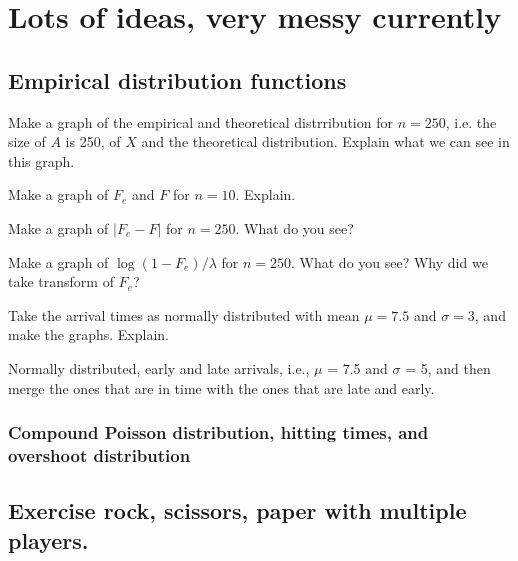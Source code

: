 \documentclass[a4paper]{article}
\begin{document}
\section{Lots of  ideas, very messy currently}
\label{sec:lots-ideas-very}


\subsection{Empirical distribution functions}
\label{sec:org27b4ea4}
\begin{exercise}
Make a graph of the empirical and theoretical distrribution for $n=250$, i.e. the size of $A$ is 250, of $X$ and the theoretical distribution. Explain what we can see in this graph. 
\end{exercise}

\begin{exercise}
Make a graph of $F_e$ and $F$  for $n=10$. Explain. 
\end{exercise}

\begin{exercise}
Make a graph of  $|F_e - F|$  for $n=250$. What do you see?
\end{exercise}

\begin{exercise}
Make a graph of  $\log(1-F_e)/\lambda$  for $n=250$. What do you see? Why did we take transform of $F_e$?
\end{exercise}


\begin{exercise}
Take the arrival times as normally distributed with mean $\mu=7.5$ and $\sigma=3$, and make the graphs. Explain. 
\end{exercise}

Normally distributed, early and late arrivals, i.e., \(\mu\) = 7.5 and \(\sigma\) = 5, and then merge the ones that are in time with the ones that are late and early. 



\subsubsection{Compound Poisson distribution, hitting times, and overshoot distribution}
\label{sec:org0740c9c}


\subsection{Exercise rock, scissors, paper with multiple players.}
\label{sec:org351adb7}
\end{document}
